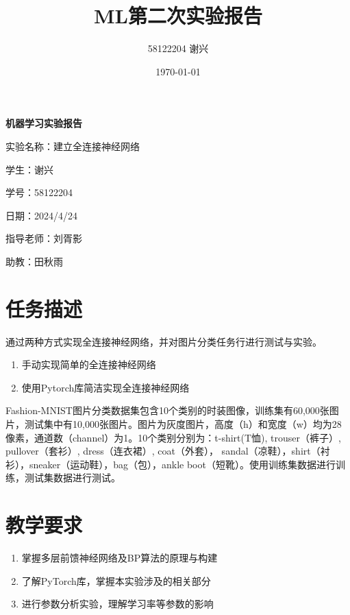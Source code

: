 \documentclass[12pt]{article}
\title{\textbf{ML第二次实验报告}}
\author{58122204 谢兴}
\date{\today}
\begin{document}
\begin{titlepage}
  \centering
  \vspace*{60pt}
  \Huge\textbf{机器学习实验报告}

  \vspace{100pt}
  \Large
  实验名称：建立全连接神经网络

  \vspace{25pt}
  学生：谢兴

  \vspace{25pt}
  学号：58122204

  \vspace{25pt}
  日期：2024/4/24

  \vspace{25pt}
  指导老师：刘胥影

  \vspace{25pt}
  助教：田秋雨



\end{titlepage}


\newpage
\tableofcontents


\section{任务描述}
通过两种方式实现全连接神经网络，并对图片分类任务行进行测试与实验。
\begin{enumerate}
  \item 手动实现简单的全连接神经网络
  \item 使用Pytorch库简洁实现全连接神经网络
\end{enumerate}

Fashion-MNIST图片分类数据集包含10个类别的时装图像，训练集有60,000张图片，测试集中有10,000张图片。图片为灰度图片，高度（h）和宽度（w）均为28像素，通道数（channel）为1。10个类别分别为：t-shirt(T恤), trouser（裤子）, pullover（套衫）, dress（连衣裙）, coat（外套）， sandal（凉鞋），shirt（衬衫），sneaker（运动鞋），bag（包），ankle boot（短靴）。使用训练集数据进行训练，测试集数据进行测试。
\section{教学要求}
\begin{enumerate}
  \item 掌握多层前馈神经网络及BP算法的原理与构建
  \item 了解PyTorch库，掌握本实验涉及的相关部分
  \item 进行参数分析实验，理解学习率等参数的影响
\end{enumerate}
\end{document}
